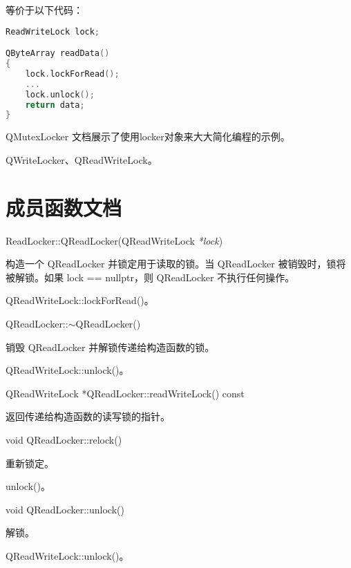 等价于以下代码：

\begin{lstlisting}[language=C++]
ReadWriteLock lock;

QByteArray readData()
{
    lock.lockForRead();
    ...
    lock.unlock();
    return data;
}
\end{lstlisting}

QMutexLocker 文档展示了使用locker对象来大大简化编程的示例。

\begin{notice}[另请参阅]
QWriteLocker、QReadWriteLock。
\end{notice}

\section{成员函数文档}

ReadLocker::QReadLocker(QReadWriteLock \emph{*lock})

构造一个 QReadLocker 并锁定用于读取的锁。当 QReadLocker 被销毁时，锁将被解锁。如果 lock == nullptr，则 QReadLocker 不执行任何操作。


\begin{notice}[另请参阅]
QReadWriteLock::lockForRead()。
\end{notice}

QReadLocker::$\sim$QReadLocker()

销毁 QReadLocker 并解锁传递给构造函数的锁。

\begin{notice}[另请参阅]
QReadWriteLock::unlock()。
\end{notice}

QReadWriteLock *QReadLocker::readWriteLock() const

返回传递给构造函数的读写锁的指针。

void QReadLocker::relock()

重新锁定。

\begin{notice}[另请参阅]
unlock()。
\end{notice}


void QReadLocker::unlock()

解锁。

\begin{notice}[另请参阅]
QReadWriteLock::unlock()。
\end{notice}